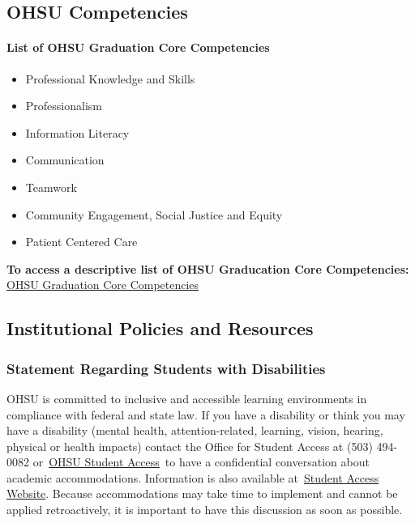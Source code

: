 \documentclass[
  letterpaper,
  DIV=11,
  numbers=noendperiod]{scrartcl}
\let\oldparagraph\paragraph
\renewcommand{\paragraph}[1]{\oldparagraph{#1}\mbox{}}
\begin{document}
\hypertarget{ohsu-competencies}{%
\subsection{OHSU Competencies}\label{ohsu-competencies}}

\hypertarget{list-of-ohsu-graduation-core-competencies}{%
\paragraph{List of OHSU Graduation Core
Competencies}\label{list-of-ohsu-graduation-core-competencies}}

\begin{itemize}
\item
  Professional Knowledge and Skills
\item
  Professionalism
\item
  Information Literacy
\item
  Communication
\item
  Teamwork
\item
  Community Engagement, Social Justice and Equity
\item
  Patient Centered Care
\end{itemize}

\textbf{To access a descriptive list of OHSU Graducation Core
Competencies:}
\href{https://www.ohsu.edu/sites/default/files/2020-11/OHSU\%20Graduation\%20Core\%20Competencies\%202020.pdf}{OHSU
Graduation Core Competencies}

\hypertarget{institutional-policies-and-resources}{%
\subsection{Institutional Policies and
Resources}\label{institutional-policies-and-resources}}

\hypertarget{statement-regarding-students-with-disabilities}{%
\subsubsection{Statement Regarding Students with
Disabilities}\label{statement-regarding-students-with-disabilities}}

OHSU is committed to inclusive and accessible learning environments in
compliance with federal and state law. If you have a disability or think
you may have a disability (mental health, attention-related, learning,
vision, hearing, physical or health impacts) contact the Office for
Student Access at (503) 494-0082
or~\href{mailto:studentaccess@ohsu.edu}{OHSU Student Access}~to have a
confidential conversation about academic accommodations. Information is
also available at~\href{http://www.ohsu.edu/student-access}{Student
Access Website}. Because accommodations may take time to implement and
cannot be applied retroactively, it is important to have this discussion
as soon as possible.
\end{document}
